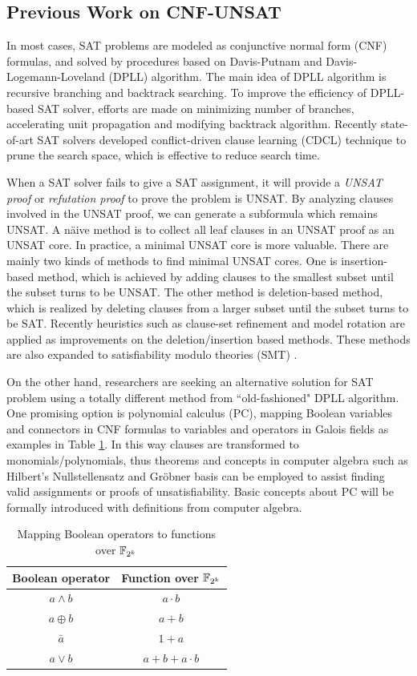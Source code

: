 \subsection{Previous Work on CNF-UNSAT}
In most cases, SAT problems are modeled as conjunctive normal form (CNF) formulas, and solved by procedures based on 
Davis-Putnam and Davis-Logemann-Loveland (DPLL) algorithm. The main idea of DPLL algorithm
is recursive branching and backtrack searching. To improve the efficiency of DPLL-based
SAT solver, efforts are made on minimizing number of branches, accelerating unit propagation
and modifying backtrack algorithm. Recently state-of-art SAT solvers developed conflict-driven
clause learning (CDCL) technique to prune the search space, which is effective to reduce
search time.

When a SAT solver fails to give a SAT assignment, it will provide a {\it UNSAT proof} or {\it refutation proof}
to prove the problem is UNSAT. By analyzing clauses involved in the UNSAT proof, we can 
generate a subformula which remains UNSAT. A n\"aive method is to collect all leaf 
clauses in an UNSAT proof as an UNSAT core. In practice, a minimal UNSAT core is more valuable.
There are mainly two kinds of methods to find minimal UNSAT cores.
One is insertion-based method, which is achieved by adding clauses to the smallest subset 
until the subset turns to be UNSAT. The other method is deletion-based method,
which is realized by deleting clauses from a larger subset until the subset turns to be SAT.
Recently heuristics such as clause-set refinement \cite{modelrotation} and model rotation \cite{belov2011accelerating}
are applied as improvements on the deletion/insertion based methods.
These methods are also expanded to satisfiability modulo theories (SMT) \cite{cimatti2007simple}.

On the other hand, researchers are seeking an alternative solution for SAT problem using a totally
different method from ``old-fashioned" DPLL algorithm. One promising option is polynomial calculus (PC),
mapping Boolean variables and connectors in CNF formulas to variables and operators in 
Galois fields as examples in Table \ref{tab:booltof4}. In this way clauses are transformed to monomials/polynomials, thus theorems and concepts in computer
algebra such as Hilbert's Nullstellensatz and Gr\"obner basis can be employed to assist finding
valid assignments or proofs of unsatisfiability. Basic concepts about PC will be formally introduced with definitions
from computer algebra.

\begin{table}[bp]
\caption{Mapping Boolean operators to functions over ${\mathbb{F}}_{2^k}$}
\centering
\begin{tabular}{|c|c|} 
\hline
 Boolean operator & Function over ${\mathbb{F}}_{2^k}$ \\
\hline
\hline
 $a\land b$ & $a\cdot b$ \\
\hline
 $a\oplus b$ & $a+b$ \\
\hline
 $\bar{a}$ & $1+a$ \\
\hline
 $a\lor b$ & $a+b+a\cdot b$\\
\hline
\end{tabular}
\label{tab:booltof4}  
\end{table}

